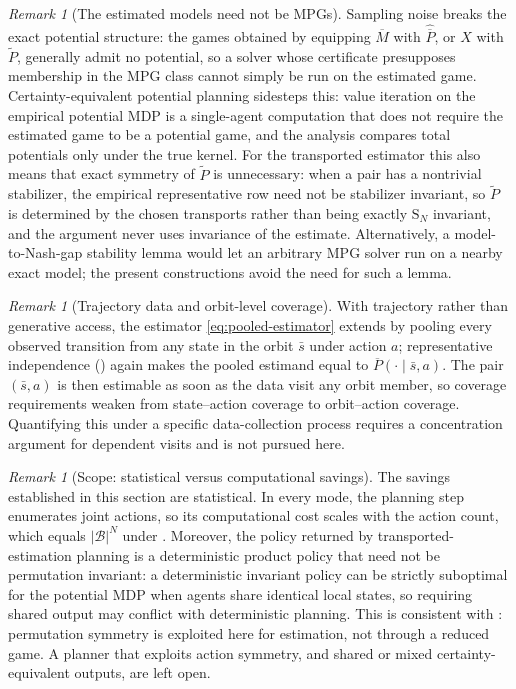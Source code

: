 \documentclass{article}
\theoremstyle{plain}
\theoremstyle{definition}
\theoremstyle{remark}
\newtheorem{remark}[theorem]{Remark}
\newcommand{\abs}[1]{\left\lvert#1\right\rvert}
\newcommand{\quotient}[1]{\overline{#1}}
\newcommand{\Sym}{\mathrm{S}}
\newcommand{\hatP}{\widehat{\quotient P}}
\newcommand{\trP}{\widetilde{P}}
\begin{document}
\begin{remark}[The estimated models need not be MPGs]
\label{rem:estimated-not-mpg}
Sampling noise breaks the exact potential structure: the games obtained by
equipping $\quotient M$ with $\hatP$, or $X$ with $\trP$, generally admit no
potential, so a solver whose certificate presupposes membership in the MPG
class cannot simply be run on the estimated game. Certainty-equivalent
potential planning sidesteps this: value iteration on the empirical potential
MDP is a single-agent computation that does not require the estimated game to
be a potential game, and the analysis compares total potentials only under the
true kernel. For the transported estimator this also means that exact symmetry
of $\trP$ is unnecessary: when a pair has a nontrivial stabilizer, the
empirical representative row need not be stabilizer invariant, so $\trP$ is
determined by the chosen transports rather than being exactly
$\Sym_N$ invariant, and the argument never uses invariance of the estimate.
Alternatively, a model-to-Nash-gap stability lemma would let an arbitrary MPG
solver run on a nearby exact model; the present constructions avoid the need
for such a lemma.
\end{remark}

\begin{remark}[Trajectory data and orbit-level coverage]
\label{rem:orbit-coverage}
With trajectory rather than generative access, the estimator
\eqref{eq:pooled-estimator} extends by pooling every observed transition from
any state in the orbit $\bar s$ under action $a$; representative independence
() again makes the pooled estimand equal to
$\quotient P(\cdot\mid\bar s,a)$. The pair $(\bar s,a)$ is then estimable as
soon as the data visit any orbit member, so coverage requirements weaken from
state--action coverage to orbit--action coverage. Quantifying this under a
specific data-collection process requires a concentration argument for
dependent visits and is not pursued here.
\end{remark}

\begin{remark}[Scope: statistical versus computational savings]
\label{rem:sample-scope}
The savings established in this section are statistical. In every mode, the
planning step enumerates joint actions, so its computational cost scales with
the action count, which equals $\abs{\mathcal B}^N$ under
. Moreover, the policy returned by
transported-estimation planning is a deterministic product policy that need
not be permutation invariant: a deterministic invariant policy can be strictly
suboptimal for the potential MDP when agents share identical local states, so
requiring shared output may conflict with deterministic planning. This is
consistent with : permutation symmetry is
exploited here for estimation, not through a reduced game. A planner that
exploits action symmetry, and shared or mixed certainty-equivalent outputs,
are left open.
\end{remark}
\end{document}
